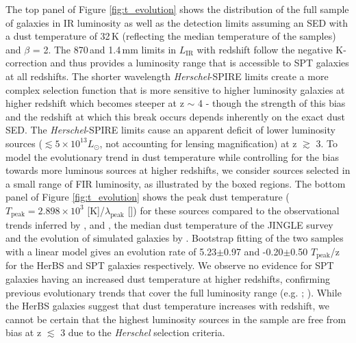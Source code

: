 The top panel of Figure \ref{fig:t_evolution} shows the distribution of the full sample of galaxies in IR luminosity as well as the detection limits assuming an SED with a dust temperature of 32\,K (reflecting the median temperature of the samples) and $\beta$ = 2. The 870\,\micron and 1.4\,mm limits in $L_{\textrm{IR}}$ with redshift follow the negative K-correction and thus provides a luminosity range that is accessible to SPT galaxies at all redshifts. The shorter wavelength \textit{Herschel}-SPIRE limits create a more complex selection function that is more sensitive to higher luminosity galaxies at higher redshift which becomes steeper at z $\sim$ 4 - though the strength of this bias and the redshift at which this break occurs depends inherently on the exact dust SED. The \textit{Herschel}-SPIRE limits cause an apparent deficit of lower luminosity sources ($\lesssim 5 \times 10^{13} L_{\odot}$, not accounting for lensing magnification) at z $\gtrsim$ 3. To model the evolutionary trend in dust temperature while controlling for the bias towards more luminous sources at higher redshifts, we consider sources selected in a small range of FIR luminosity, as illustrated by the boxed regions. The bottom panel of Figure \ref{fig:t_evolution} shows the peak dust temperature ($T_{\textrm{peak}} = 2.898 \times 10^{3}$ [\micron K]/$\lambda_{\textrm{peak}}$ [\micron]) for these sources compared to the observational trends inferred by \citealt{Schreiber_2018}, \citealt{Bouwens_2020} and \citealt{Viero_2022}, the median dust temperature of the JINGLE survey and the evolution of simulated galaxies by \citealt{Liang_2019}. Bootstrap fitting of the two samples with a linear model gives an evolution rate of 5.23$\pm$0.97 and -0.20$\pm$0.50 $T_{\textrm{peak}}$/z for the HerBS and SPT galaxies respectively. We observe no evidence for SPT galaxies having an increased dust temperature at higher redshifts, confirming previous evolutionary trends that cover the full luminosity range (e.g. \citealt{Reuter_2020}; \citealt{Witstok_2023}). While the HerBS galaxies suggest that dust temperature increases with redshift, we cannot be certain that the highest luminosity sources in the sample are free from bias at z $\lesssim$ 3 due to the \textit{Herschel} selection criteria. 

